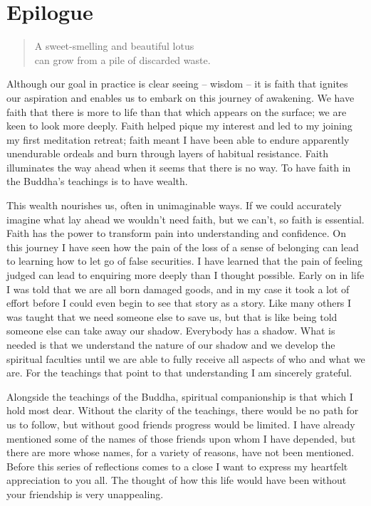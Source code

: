 \chapter{Epilogue}

\begin{quote}
A sweet-smelling and beautiful lotus\\
can grow from a pile of discarded waste.

\end{quote}

Although our goal in practice is clear seeing -- wisdom -- it is faith
that ignites our aspiration and enables us to embark on this journey of
awakening. We have faith that there is more to life than that which
appears on the surface; we are keen to look more deeply. Faith helped
pique my interest and led to my joining my first meditation retreat;
faith meant I have been able to endure apparently unendurable ordeals
and burn through layers of habitual resistance. Faith illuminates the
way ahead when it seems that there is no way. To have faith in the
Buddha's teachings is to have wealth.

This wealth nourishes us, often in unimaginable ways. If we could
accurately imagine what lay ahead we wouldn't need faith, but we can't,
so faith is essential. Faith has the power to transform pain into
understanding and confidence. On this journey I have seen how the pain
of the loss of a sense of belonging can lead to learning how to let go
of false securities. I have learned that the pain of feeling judged can
lead to enquiring more deeply than I thought possible. Early on in life
I was told that we are all born damaged goods, and in my case it took a
lot of effort before I could even begin to see that story as a story.
Like many others I was taught that we need someone else to save us, but
that is like being told someone else can take away our shadow. Everybody
has a shadow. What is needed is that we understand the nature of our
shadow and we develop the spiritual faculties until we are able to fully
receive all aspects of who and what we are. For the teachings that point
to that understanding I am sincerely grateful.

Alongside the teachings of the Buddha, spiritual companionship is that
which I hold most dear. Without the clarity of the teachings, there
would be no path for us to follow, but without good friends progress
would be limited. I have already mentioned some of the names of those
friends upon whom I have depended, but there are more whose names, for a
variety of reasons, have not been mentioned. Before this series of
reflections comes to a close I want to express my heartfelt appreciation
to you all. The thought of how this life would have been without your
friendship is very unappealing.

